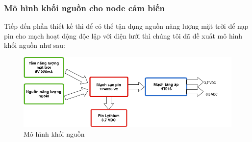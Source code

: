 \subsubsection*{Mô hình khối nguồn cho node cảm biến}
Tiếp đến phần thiết kế thì để có thể tận dụng nguồn năng lượng mặt trời để nạp pin cho mạch hoạt động độc lập với điện lưới thì chúng tôi đã đề xuất mô hình khối nguồn như sau:
\begin{figure}[H]
\centering    
\includegraphics[width=6in]{khoinguon}
\caption[Mô hình khối nguồn]{Mô hình khối nguồn}
\label{fig:khoinguon}
\end{figure}

